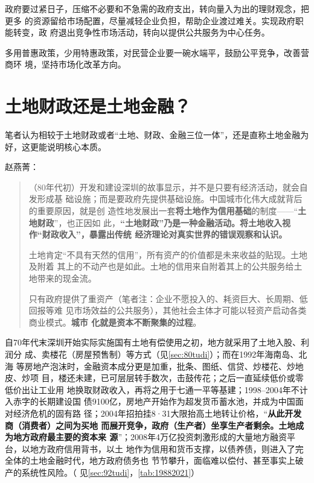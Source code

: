政府要过紧日子，压缩不必要和不急需的政府支出，转向量入为出的理财观念，把更多
的资源留给市场配置，尽量减轻企业负担，帮助企业渡过难关。实现政府职能转变，政
府退出竞争性市场活动，转向以提供公共服务为中心任务。

多用普惠政策，少用特惠政策，对民营企业要一碗水端平，鼓励公平竞争，改善营商环
境，坚持市场化改革方向。


\section{土地财政还是土地金融？}

笔者认为相较于土地财政或者“土地、财政、金融三位一体”，还是直称土地金融为
好，这更能说明核心本质。

赵燕菁：
\begin{quotation}
  （80年代初）开发和建设深圳的故事显示，并不是只要有经济活动，就会自发形成基
  础设施；而是要政府先提供基础设施。中国城市化伟大成就背后的重要原因，就是创
  造性地发展出一套\textbf{将土地作为信用基础}的制度——“\textbf{土地财政}”，也正因如
  此，\textbf{“土地财政”乃是一种金融活动。将土地收入视作“财政收入”，暴露出传统
    经济理论对真实世界的错误观察和认识。}

  土地肯定“不具有天然的信用”，所有资产的价值都是未来收益的贴现。土地及附着
  其上的不动产也是如此。土地的信用来自附着其上的公共服务给土地带来的现金流。

  只有政府提供了重资产（笔者注：企业不愿投入的、耗资巨大、长周期、低回报等难
  见市场效益的公共服务），其他社会主体才可能以轻资产启动各类商业模式。\textbf{城市
    化就是资本不断聚集的过程}。
\end{quotation}

自70年代末深圳开始实际实施国有土地有偿使用之初，地方就采用了土地入股、利润分
成、卖楼花（房屋预售制）等方式（见\cref{sec:80tudi}）；而在1992年海南岛、北海
等房地产泡沫时，金融资本成分更是加重，批条、图纸、信贷、炒楼花、炒地皮、炒项
目，楼还未建，已可层层转手数次，击鼓传花；之后一直延续低价或零低价出让工业用
地换取财政收入，再将之用于七通一平等基建；1998--2004年不计入赤字的长期建设国
债9100亿，房地产开始作为超发货币蓄水池，并成为中国面对经济危机的固有路
径；2004年招拍挂8·31大限抬高土地转让价格，“\textbf{从此开发商（消费者）之间为买地
  而展开竞争，政府（生产者）坐享生产者剩余。土地成为地方政府最主要的资本来
  源}”；2008年4万亿投资刺激形成的大量地方融资平台，以地方政府信用背书，以土
地作为信用和货币支撑，以债养债，则进入了完全体的土地金融时代，地方政府债务也
节节攀升，面临难以偿付、甚至事实上破产的系统性风险。（
见\cref{sec:92tudi}，\cref{tab:19882021}）



